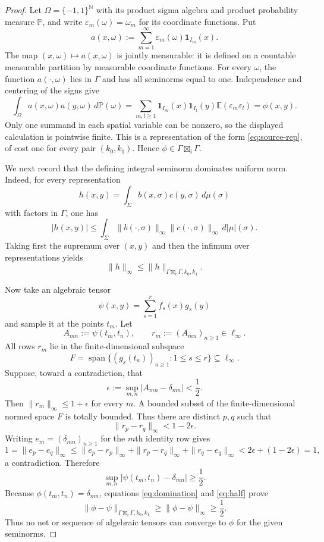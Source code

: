 \documentclass[11pt]{article}
\newcommand{\N}{\mathbb N}
\newcommand{\G}{\Gamma}
\newcommand{\bi}{\mathbin{\boxtimes_{i}}}
\begin{document}
\begin{proof}
Let $\Omega=\{-1,1\}^{\N}$ with its product sigma algebra and product
probability measure $\mathbb P$, and write $\varepsilon_m(\omega)=\omega_m$
for its coordinate functions.  Put
\begin{equation}\label{eq:a}
 a(x,\omega):=\sum_{m=1}^{\infty}
 \varepsilon_m(\omega)\mathbf 1_{I_m}(x).
\end{equation}
The map $(x,\omega)\mapsto a(x,\omega)$ is jointly measurable: it is defined
on a countable measurable partition by measurable coordinate functions.  For
every $\omega$, the function $a(\cdot,\omega)$ lies in $\G$ and has all
seminorms equal to one.  Independence and centering of the signs give
\[
 \int_\Omega a(x,\omega)a(y,\omega)\,d\mathbb P(\omega)
 =\sum_{m,l\geq1}\mathbf 1_{I_m}(x)\mathbf 1_{I_l}(y)
   \mathbb E(\varepsilon_m\varepsilon_l)
 =\phi(x,y).
\]
Only one summand in each spatial variable can be nonzero, so the displayed
calculation is pointwise finite.  This is a representation of the form
\eqref{eq:source-rep}, of cost one for every pair $(k_0,k_1)$.  Hence
$\phi\in\G\bi\G$.

We next record that the defining integral seminorm dominates uniform norm.
Indeed, for every representation
\[
 h(x,y)=\int_\Sigma b(x,\sigma)c(y,\sigma)\,d\mu(\sigma)
\]
with factors in $\G$, one has
\[
 |h(x,y)|\leq\int_\Sigma
 \|b(\cdot,\sigma)\|_\infty
 \|c(\cdot,\sigma)\|_\infty\,d|\mu|(\sigma).
\]
Taking first the supremum over $(x,y)$ and then the infimum over
representations yields
\begin{equation}\label{eq:domination}
 \|h\|_\infty\leq\|h\|_{\G\bi\G,k_0,k_1}.
\end{equation}

Now take an algebraic tensor
\[
 \psi(x,y)=\sum_{s=1}^{r}f_s(x)g_s(y)
\]
and sample it at the points $t_m$.  Let
\[
 A_{mn}:=\psi(t_m,t_n),\qquad
 r_m:=(A_{mn})_{n\geq1}\in\ell_\infty.
\]
All rows $r_m$ lie in the finite-dimensional subspace
\[
 F=\operatorname{span}\{(g_s(t_n))_{n\geq1}:1\leq s\leq r\}
 \subseteq\ell_\infty.
\]
Suppose, toward a contradiction, that
\[
 \epsilon:=\sup_{m,n}|A_{mn}-\delta_{mn}|<\frac12.
\]
Then $\|r_m\|_\infty\leq1+\epsilon$ for every $m$.  A bounded subset of the
finite-dimensional normed space $F$ is totally bounded.  Thus there are
distinct $p,q$ such that
\[
 \|r_p-r_q\|_\infty<1-2\epsilon.
\]
Writing $e_m=(\delta_{mn})_{n\geq1}$ for the $m$th identity row gives
\[
 1=\|e_p-e_q\|_\infty
 \leq\|e_p-r_p\|_\infty+\|r_p-r_q\|_\infty
       +\|r_q-e_q\|_\infty
 <2\epsilon+(1-2\epsilon)=1,
\]
a contradiction.  Therefore
\begin{equation}\label{eq:half}
 \sup_{m,n}|\psi(t_m,t_n)-\delta_{mn}|\geq\frac12.
\end{equation}
Because $\phi(t_m,t_n)=\delta_{mn}$, equations
\eqref{eq:domination} and \eqref{eq:half} prove
\[
 \|\phi-\psi\|_{\G\bi\G,k_0,k_1}
 \geq\|\phi-\psi\|_\infty\geq\frac12.
\]
Thus no net or sequence of algebraic tensors can converge to $\phi$ for the
given seminorms.
\end{proof}
\end{document}
